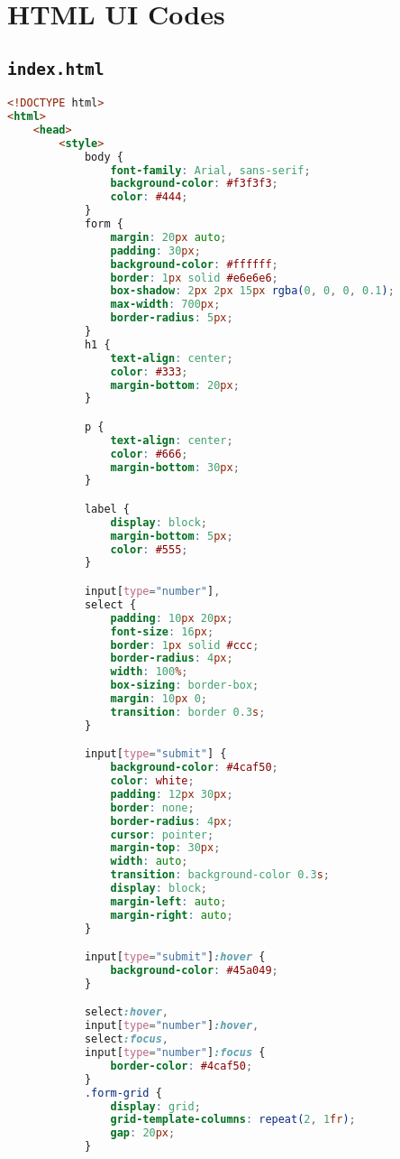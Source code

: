 \section{HTML UI Codes}
\subsection{\lstinline{index.html}}
\begin{lstlisting}[language=HTML, basicstyle=\footnotesize\ttfamily]
<!DOCTYPE html>
<html>
	<head>
		<style>
			body {
				font-family: Arial, sans-serif;
				background-color: #f3f3f3;
				color: #444;
			}
			form {
				margin: 20px auto;
				padding: 30px;
				background-color: #ffffff;
				border: 1px solid #e6e6e6;
				box-shadow: 2px 2px 15px rgba(0, 0, 0, 0.1);
				max-width: 700px;
				border-radius: 5px;
			}
			h1 {
				text-align: center;
				color: #333;
				margin-bottom: 20px;
			}

			p {
				text-align: center;
				color: #666;
				margin-bottom: 30px;
			}

			label {
				display: block;
				margin-bottom: 5px;
				color: #555;
			}

			input[type="number"],
			select {
				padding: 10px 20px;
				font-size: 16px;
				border: 1px solid #ccc;
				border-radius: 4px;
				width: 100%;
				box-sizing: border-box;
				margin: 10px 0;
				transition: border 0.3s;
			}

			input[type="submit"] {
				background-color: #4caf50;
				color: white;
				padding: 12px 30px;
				border: none;
				border-radius: 4px;
				cursor: pointer;
				margin-top: 30px;
				width: auto;
				transition: background-color 0.3s;
				display: block;
				margin-left: auto;
				margin-right: auto;
			}

			input[type="submit"]:hover {
				background-color: #45a049;
			}

			select:hover,
			input[type="number"]:hover,
			select:focus,
			input[type="number"]:focus {
				border-color: #4caf50;
			}
			.form-grid {
				display: grid;
				grid-template-columns: repeat(2, 1fr);
				gap: 20px;
			}


\end{lstlisting}
